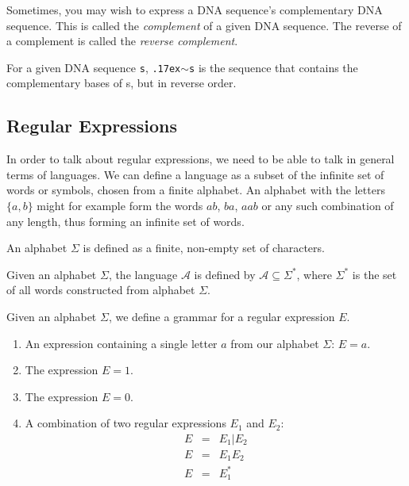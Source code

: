 \documentclass[12pt]{article}
\theoremstyle{definition}
\begin{document}
Sometimes, you may wish to express a DNA sequence's complementary DNA sequence. This is called the \emph{complement} of a given DNA sequence. The reverse of a complement is called the \emph{reverse complement}.

\begin{definition}
For a given DNA sequence \texttt{s}, \texttt{{\raise.17ex\hbox{$\scriptstyle\mathtt{\sim}$}}s} is the sequence that contains the complementary bases of s, but in reverse order.
\end{definition}

\subsection{Regular Expressions}

In order to talk about regular expressions, we need to be able to talk in general terms of languages. We can define a language as a subset of the infinite set of words or symbols, chosen from a finite alphabet. An alphabet with the letters $\{a,b\}$ might for example form the words $ab$, $ba$, $aab$ or any such combination of any length, thus forming an infinite set of words.\\

\begin{definition} An alphabet $\Sigma$ is defined as a finite, non-empty set of characters.

\end{definition}

\begin{definition} Given an alphabet $\Sigma$, the language $\mathcal{A}$ is defined by $\mathcal{A} \subseteq \Sigma^*$, where $\Sigma^*$ is the set of all words constructed from alphabet $\Sigma$.
	
\end{definition} 

\begin{definition} Given an alphabet $\Sigma$, we define a grammar for a regular expression $E$.\\

	\begin{enumerate}
		\item An expression containing a single letter $a$ from our alphabet $\Sigma$: $E = a$. 
		\item The expression $E = 1$.
		\item The expression $E = 0$.
		\item A combination of two regular expressions $E_1$ and $E_2$:
		\begin{eqnarray}
			E &=& E_1 | E_2 \\
			E &=& E_1E_2 \\
			E &=& E_1^*
		\end{eqnarray}
	\end{enumerate}	
\end{definition} 
\end{document}
